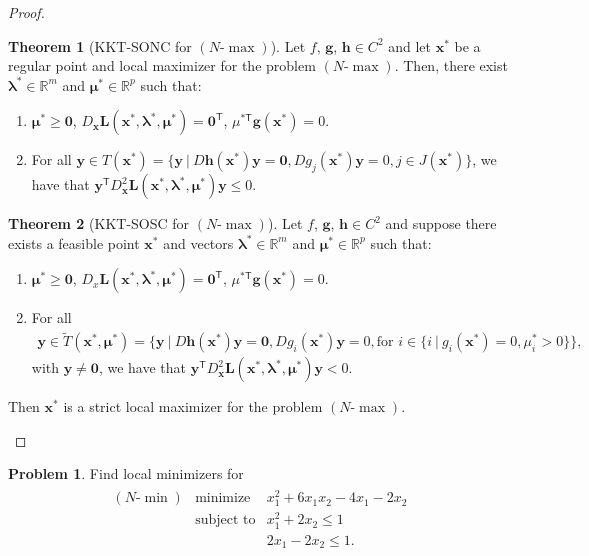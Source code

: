 \documentclass[12pt]{article}
\theoremstyle{definition}
\newtheorem{problem}{Problem}
\newcommand{\vc}[1]{\boldsymbol{#1}}
\newcommand{\tran}{\mathsf{T}}
\newtheorem{theorem}{Theorem}
\begin{document}
\begin{proof}
  \begin{theorem}[KKT-SONC for $(N\text{-}\max)$]
    Let $f$, $\vc{g}$, $\vc{h} \in C^2$ and let
    $\vc{x}^*$ be a regular point and local maximizer for the problem $(N\text{-}\max)$. Then,
    there exist $\vc{\lambda}^*\in\mathbb{R}^m$
    and $\vc{\mu}^* \in \mathbb{R}^p$ such that:
    \begin{enumerate}[label=\roman*.]
      \item $\vc{\mu}^* \geq \vc{0}$, $D_{\vc{x}}\vc{L}(\vc{x}^*, \vc{\lambda}^*, \vc{\mu}^*) = \vc{0}^\tran$, $\mu^{*\tran}\vc{g}(\vc{x}^*) = 0$.
      \item For all $\vc{y}\in T(\vc{x}^*) = \{\vc{y}\ |\ D\vc{h}(\vc{x}^*)\vc{y}=\vc{0}, Dg_j(\vc{x}^*)\vc{y} = 0, j \in J(\vc{x}^*)\}$, we have that $\vc{y}^\tran D_{\vc{x}}^2\vc{L}(\vc{x}^*, \vc{\lambda}^*, \vc{\mu}^*)\vc{y} \leq 0$.
    \end{enumerate}
  \end{theorem}

  \begin{theorem}[KKT-SOSC for $(N\text{-}\max)$]
    Let $f$, $\vc{g}$, $\vc{h} \in C^2$ and suppose there exists a feasible point
    $\vc{x}^*$ and vectors $\vc{\lambda}^*\in\mathbb{R}^m$
    and $\vc{\mu}^* \in \mathbb{R}^p$ such that:
    \begin{enumerate}[label=\roman*.]
      \item $\vc{\mu}^* \geq \vc{0}$, $D_x\vc{L}(\vc{x}^*, \vc{\lambda}^*, \vc{\mu}^*) = \vc{0}^\tran$, $\mu^{*\tran}\vc{g}(\vc{x}^*) = 0$.
      \item For all
        \begin{align*}
          \vc{y}\in \widetilde{T}(\vc{x}^*, \vc{\mu}^*) = \{\vc{y}\ |\ D\vc{h}(\vc{x}^*)\vc{y} = \vc{0}, Dg_i(\vc{x}^*)\vc{y} = 0, \text{for $i \in \{i\ |\ g_i(\vc{x}^*) = 0, \mu_i^* > 0\}$}\},
        \end{align*}
        with $\vc{y} \neq \vc{0}$, we have that $\vc{y}^\tran D_{\vc{x}}^2\vc{L}(\vc{x}^*, \vc{\lambda}^*, \vc{\mu}^*)\vc{y} < 0$.
    \end{enumerate}
    Then $\vc{x}^*$ is a strict local maximizer for the problem $(N\text{-}\max)$.
  \end{theorem}
\end{proof}
\newpage


\begin{problem}
  Find local minimizers for
  \begin{align*}
    \begin{array}{rrl}
      (N\text{-}\min) & \text{minimize} & x_1^2 + 6x_1x_2 -4x_1 -2x_2\\
      & \text{subject to} & x_1^2 + 2x_2 \leq 1\\
      & & 2x_1 -2x_2 \leq 1.
    \end{array}
  \end{align*}
\end{problem}
\end{document}
